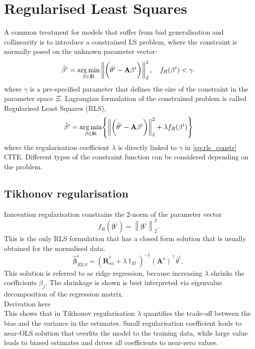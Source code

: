 \documentclass[a4paper,11pt,twoside]{article}
\newcommand{\norm}[1]{\left\lVert#1\right\rVert}
\DeclareMathOperator{\eye}{\mathbb{I}}
\DeclareMathOperator{\R}{\rm I\!R}
\theoremstyle{mytheoremstyle}
\begin{document}
\section{Regularised Least Squares}
\par A common treatment for models that suffer from bad generalisation and collinearity is to introduce a constrained LS problem, where the constraint is normally posed on the unknown parameter vector:
\begin{equation}\label{eq:rls_constr}
\hat{\mathbf{\beta}}^i = \underset{\beta \in \R}{\arg \min}\norm{ \biggl(\bar{\theta}^i - \mathbf{A} \mathbf{\beta}^i \biggr) }^{2}_{2}, \quad f_{R}(\mathbf{\beta}^i) < \gamma.
\end{equation}
where $\gamma$ is a pre-specified parameter that defines the size of the constraint in the parameter space $\Xi$.
Lagrangian formulation of the constrained problem is called Regularised Least Squares (RLS),
\begin{equation}\label{eq:rls_problem}
\hat{\mathbf{\beta}}^i = \underset{\beta \in \R}{\arg \min} \Biggl\{\norm{ \biggl(\bar{\theta}^i - \mathbf{A} \mathbf{\beta}^i \biggr) }^{2}_{2} + \lambda f_{R}(\mathbf{\beta}^i)\Biggr\}
\end{equation}
where the regularisation coefficient $\lambda$ is directly linked to  $\gamma$ in \eqref{eq:rls_constr} CITE. Different types of the constraint function can be considered depending on the problem.
\subsection{Tikhonov regularisation}
Innovation regularisation  constrains the 2-norm of the parameter vector
\begin{equation}
f_{R}(\mathbf{\beta}^i) = \norm{\mathbf{\beta}^i}^{2}_{2}.
\end{equation}
This is the only RLS formulation that has a closed form solution that is usually obtained for the normalised data. 
\begin{equation}
\hat{\mathbf{\beta}}^{i}_{RLS} = (\mathbf{R}^{*}_{aa} + \lambda \eye_M)^{-1} (\mathbf{A}^{\star})^{\top}\bar{\theta}^i,  
\end{equation}
This solution is referred to as ridge regression, because increasing $\lambda$ shrinks the coefficients $\beta_j$. The shrinkage is shown is best interpreted via eigenvalue decomposition of the regression matrix.\\
Derivation here\\
This shows that in Tikhonov regularisation $\lambda$ quantifies the trade-off between the bias and the variance in the estimates. Small regularisation coefficient leads to near-OLS solution that overfits the model to the training data, while large value leads to biased estimates and drives all coefficients to near-zero values.
\end{document}
